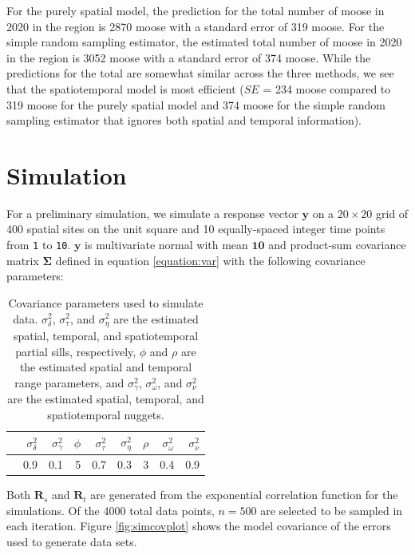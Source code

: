 \documentclass[]{interact}
\theoremstyle{plain}%
\theoremstyle{definition}
\theoremstyle{remark}
\begin{document}
For the purely spatial model, the prediction for the total number of
moose in 2020 in the region is 2870 moose with a standard error of 319
moose. For the simple random sampling estimator, the estimated total
number of moose in 2020 in the region is 3052 moose with a standard
error of 374 moose. While the predictions for the total are somewhat
similar across the three methods, we see that the spatiotemporal model
is most efficient (\(SE\) = 234 moose compared to 319 moose for the
purely spatial model and 374 moose for the simple random sampling
estimator that ignores both spatial and temporal information).

\section{Simulation} \label{section:Simulation}

For a preliminary simulation, we simulate a response vector
\(\mathbf{y}\) on a \(20 \times 20\) grid of 400 spatial sites on the
unit square and 10 equally-spaced integer time points from \texttt{1} to
\texttt{10}. \(\mathbf{y}\) is multivariate normal with mean
\(\mathbf{10}\) and product-sum covariance matrix \(\bm{\Sigma}\)
defined in equation \ref{equation:var} with the following covariance
parameters:

\begin{table}[ht]
\centering
\begin{tabular}{rrrrrrrrr}
  \hline
 & $\sigma^2_{\delta}$ & $\sigma^2_{\gamma}$ & $\phi$ & $\sigma^2_{\tau}$ & $\sigma^2_{\eta}$ & $\rho$ & $\sigma^2_{\omega}$ & $\sigma^2_{\nu}$ \\
  \hline
& 0.9 & 0.1 & 5 & 0.7 & 0.3 & 3 & 0.4 & 0.9 \\
   \hline
\end{tabular}
\caption{Covariance parameters used to simulate data. $\sigma^2_{\delta}$, $\sigma^2_{\tau}$, and $\sigma^2_{\eta}$ are the estimated spatial, temporal, and spatiotemporal partial sills, respectively, $\phi$ and $\rho$ are the estimated spatial and temporal range parameters, and $\sigma^2_{\gamma}$, $\sigma^2_{\omega}$, and $\sigma^2_{\nu}$ are the estimated spatial, temporal, and spatiotemporal nuggets.}
\label{simparms}
\end{table}

Both \(\mathbf{R}_{s}\) and \(\mathbf{R}_t\) are generated from the
exponential correlation function for the simulations. Of the 4000 total
data points, \(n = 500\) are selected to be sampled in each iteration.
Figure \ref{fig:simcovplot} shows the model covariance of the errors
used to generate data sets.
\end{document}

